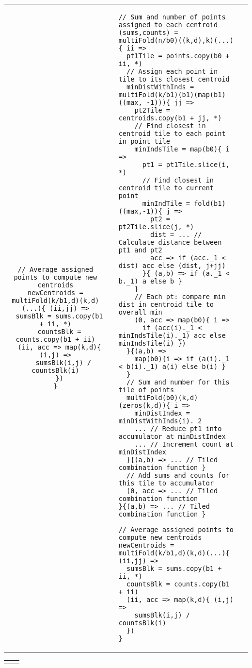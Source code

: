 \documentclass[pageno]{jpaper}
\begin{document}
\begin{figure*}
\begin{tabular}{cm{}m{}m{}}
{\begin{lstlisting}
// Average assigned points to compute new centroids
newCentroids = multiFold(k/b1,d)(k,d)(...){ (ii,jj) =>
  sumsBlk = sums.copy(b1 + ii, *)
  countsBlk = counts.copy(b1 + ii)
  (ii, acc => map(k,d){ (i,j) =>
    sumsBlk(i,j) / countsBlk(i)
  })
}
\end{lstlisting}} & \hfill &
{\begin{lstlisting}
// Sum and number of points assigned to each centroid
(sums,counts) = multiFold(n/b0)((k,d),k)(...){ ii =>
  pt1Tile = points.copy(b0 + ii, *)
  // Assign each point in tile to its closest centroid
  minDistWithInds = multiFold(k/b1)(b1)(map(b1)((max, -1))){ jj =>
    pt2Tile = centroids.copy(b1 + jj, *)
    // Find closest in centroid tile to each point in point tile
    minIndsTile = map(b0){ i =>
      pt1 = pt1Tile.slice(i, *)
      // Find closest in centroid tile to current point
      minIndTile = fold(b1)((max,-1)){ j =>
        pt2 = pt2Tile.slice(j, *)
        dist = ... // Calculate distance between pt1 and pt2
        acc => if (acc._1 < dist) acc else (dist, j+jj)
      }{ (a,b) => if (a._1 < b._1) a else b }
    }
    // Each pt: compare min dist in centroid tile to overall min
    (0, acc => map(b0){ i =>
      if (acc(i)._1 < minIndsTile(i)._1) acc else minIndsTile(i) })
  }{(a,b) =>
    map(b0){i => if (a(i)._1 < b(i)._1) a(i) else b(i) }
  }
  // Sum and number for this tile of points
  multiFold(b0)(k,d)(zeros(k,d)){ i =>
    minDistIndex = minDistWithInds(i)._2
    ... // Reduce pt1 into accumulator at minDistIndex
    ... // Increment count at minDistIndex
  }{(a,b) => ... // Tiled combination function }
  // Add sums and counts for this tile to accumulator
  (0, acc => ... // Tiled combination function
}{(a,b) => ... // Tiled combination function }

// Average assigned points to compute new centroids
newCentroids = multiFold(k/b1,d)(k,d)(...){ (ii,jj) =>
  sumsBlk = sums.copy(b1 + ii, *)
  countsBlk = counts.copy(b1 + ii)
  (ii, acc => map(k,d){ (i,j) =>
    sumsBlk(i,j) / countsBlk(i)
  })
}
\end{lstlisting}}
\end{tabular}

\vspace{-0.2in}\begin{tabular}{cc}
{\parbox{0.45\textwidth}{}} &
{\parbox{0.5\textwidth}{}}
\end{tabular}

\vspace{0.1in}
\footnotesize{\begin{tabular}{|l|cc|cc|cc|}


\end{tabular}}
\end{figure*}
\end{document}
